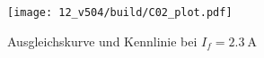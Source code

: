 \begin{figure}[h]
    \centering
    \texttt{[image: 12\_v504/build/C02\_plot.pdf]}
    \caption{Ausgleichskurve und Kennlinie bei $I_f = \qty{2.3}{\ampere}$}
    \label{fig:c02}
\end{figure}